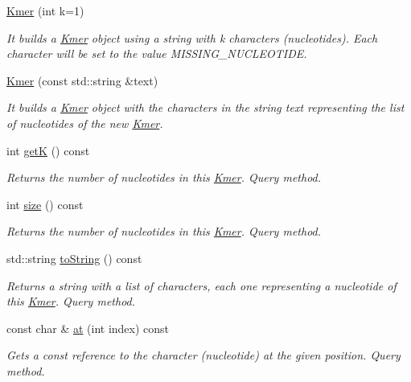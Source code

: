 \begin{DoxyCompactItemize}
\item 
\hyperlink{classKmer_abc5e0d1f463758603c9590b7cee4e500}{Kmer} (int k=1)
\begin{DoxyCompactList}\small\item\em It builds a \hyperlink{classKmer}{Kmer} object using a string with {\ttfamily k} characters (nucleotides). Each character will be set to the value {\ttfamily M\+I\+S\+S\+I\+N\+G\+\_\+\+N\+U\+C\+L\+E\+O\+T\+I\+DE}. \end{DoxyCompactList}\item 
\hyperlink{classKmer_a712f590bb809f86badfef9f3f0998f44}{Kmer} (const std\+::string \&text)
\begin{DoxyCompactList}\small\item\em It builds a \hyperlink{classKmer}{Kmer} object with the characters in the string {\ttfamily text} representing the list of nucleotides of the new \hyperlink{classKmer}{Kmer}. \end{DoxyCompactList}\item 
int \hyperlink{classKmer_abba3593449208b49650b204df1b5201c}{getK} () const 
\begin{DoxyCompactList}\small\item\em Returns the number of nucleotides in this \hyperlink{classKmer}{Kmer}. Query method. \end{DoxyCompactList}\item 
int \hyperlink{classKmer_a1bfb58daeb049f2fc31acad74acf8f21}{size} () const 
\begin{DoxyCompactList}\small\item\em Returns the number of nucleotides in this \hyperlink{classKmer}{Kmer}. Query method. \end{DoxyCompactList}\item 
std\+::string \hyperlink{classKmer_a4d1c9969f5777817084e86c6b2df8778}{to\+String} () const 
\begin{DoxyCompactList}\small\item\em Returns a string with a list of characters, each one representing a nucleotide of this \hyperlink{classKmer}{Kmer}. Query method. \end{DoxyCompactList}\item 
const char \& \hyperlink{classKmer_ab4ce84f7b3cac79896c1ca08124694a9}{at} (int index) const 
\begin{DoxyCompactList}\small\item\em Gets a const reference to the character (nucleotide) at the given position. Query method. \end{DoxyCompactList}\item 

\end{DoxyCompactItemize}
